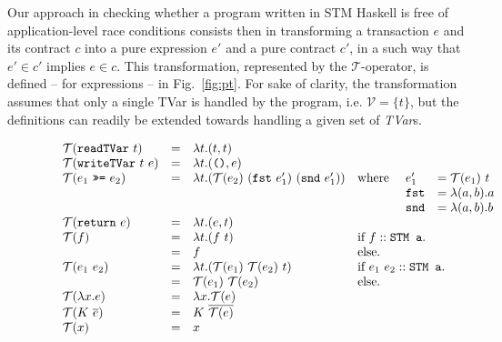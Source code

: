 \documentclass[submission,copyright,creativecommons]{eptcs}
\newcommand{\code}[1]{\textrm{{\tt #1}}}
\newcommand{\readTVarONLY}{\ensuremath{\code{readTVar}}}
\newcommand{\readTVar}[1]{\ensuremath{\readTVarONLY \ #1}}
\newcommand{\writeTVarONLY}{\ensuremath{\code{writeTVar}}}
\newcommand{\writeTVar}[2]{\ensuremath{\writeTVarONLY \ #1 \ #2}}
\newcommand{\bindTM}{\ \ensuremath{\code{>>=}} \ }
\newcommand{\returnTMONLY}{\ensuremath{\code{return}}}
\newcommand{\returnTM}[1]{\ensuremath{\returnTMONLY \ #1}}
\newcommand{\pt}{\ensuremath{\mathcal{T}}}
\begin{document}
Our approach in checking whether a program written in STM Haskell is free of application-level race conditions consists then in transforming a transaction $e$ and its contract $c$ into a pure expression $e'$ and a pure contract $c'$, in a such way that $e' \in c'$ implies $e \in c$. This transformation, represented by the $\pt$-operator, is defined -- for expressions -- in Fig.~\ref{fig:pt}. For sake of clarity, the transformation assumes that only a single TVar is handled by the program, i.e. $\mathcal{V} = \{t\}$, but the definitions can readily be extended towards handling a given set of \emph{TVar}s.
\begin{figure*}[t]
  \centering
\begin{math}
    \begin{array}{lllllll}
& \pt(\readTVar{t})     & = & \lambda t . (t,t) \\
     & \pt(\writeTVar{t}{e}) & = & \lambda t . (\code{()},e) \\
     & \pt(e_1 \bindTM e_2)  & = & \lambda t . (\pt(e_2) \ (\code{fst} \ e_1') \ (\code{snd} \ e_1')) & \mbox{where} \ & e_1'  & = \pt(e_1) \ t \\
      &                       &   &                                                              &                & \code{fst}& = \lambda (a,b) . a \\
     &                       &   &                                                              &                & \code{snd}& = \lambda (a,b) . b \\
     & \pt(\returnTM{e})     & = & \lambda t . (e,t) \\  
& \pt(f)                & = & \lambda t . (f \ t)                                            & \multicolumn{3}{l}{\mbox{if $f :: \code{STM a}$.}}\\
     &                       & = & f                                                            & \multicolumn{3}{l}{\mbox{else.}}\\
     & \pt(e_1 \ e_2)        & = & \lambda t . (\pt(e_1) \ \pt(e_2) \ t )                        & \multicolumn{3}{l}{\mbox{if $e_1 \ e_2:: \code{STM a}$.}}\\
     &                       & = & \pt(e_1) \ \pt(e_2)                                                    & \multicolumn{3}{l}{\mbox{else.}}\\& \pt(\lambda x . e)    & = & \lambda x . \pt(e) \\
     & \pt(K \ \overline{e}) & = & K \ \overline{\pt(e)} \\
     & \pt(x)                & = & x \\

\end{array}
\end{math}
\end{figure*}
\end{document}
